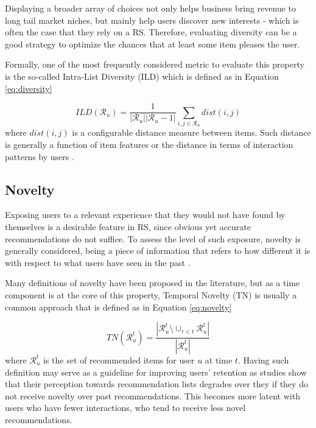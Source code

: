 Displaying a broader array of choices not only helps business bring revenue to long tail market niches, but mainly help users discover new interests - which is often the case that they rely on a RS. Therefore, evaluating diversity can be a good strategy to optimize the chances that at least some item pleases the user.

Formally, one of the most frequently considered metric to evaluate this property is the so-called Intra-List Diversity (ILD)  \cite{2001SimilarityDiversity} which is defined as in Equation \ref{eq:diversity}

\begin{equation}
    \label{eq:diversity}
    ILD (\mathcal{R}_u) = \frac{1}{|\mathcal{R}_u||\mathcal{R}_u-1|} \sum_{i, j \in \mathcal{R}_u} dist(i,j)
\end{equation} where $dist(i,j)$ is a configurable distance measure between items. Such distance is generally a function of item features \cite{10.1145/1060745.1060754} or the distance in terms of interaction patterns by users \cite{2014NoveltyDiversityEnhancement}.


\subsection{Novelty}

Exposing users to a relevant experience that they would not have found by themselves is a desirable feature in RS, since obvious yet accurate recommendations do not suffice. To assess the level of such exposure, novelty is generally considered, being a piece of information that refers to how different it is with respect to what users have seen in the past \cite{2011RankNoveltyDiversity}. 

Many definitions of novelty have been proposed in the literature, but as a time component is at the core of this property, Temporal Novelty (TN)  is usually a common approach that is defined as in Equation \ref{eq:novelty}

\begin{equation}
\label{eq:novelty}
    TN(\mathcal{R}^t_u) = \frac{|\mathcal{R}^t_u \setminus \cup_{\tau < t} \mathcal{R}^t_u|}{|\mathcal{R}^t_u|}
\end{equation} where $\mathcal{R}^t_u$ is the set of recommended items for user $u$ at time $t$. Having such definition may serve as a guideline for improving users' retention as studies show that their perception towards recommendation lists degrades over they if they do not receive novelty over past recommendations. This becomes more latent with users who have fewer interactions, who tend to receive less novel recommendations.

